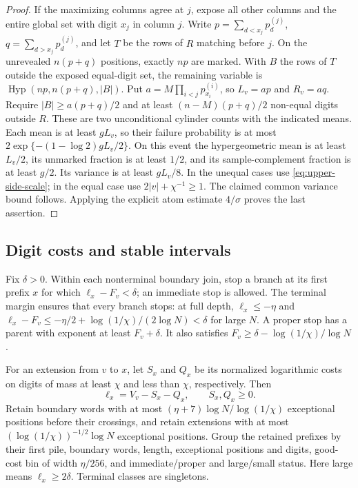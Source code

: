 \begin{proof}
If the maximizing columns agree at $j$, expose all other columns and
the entire global set with digit $x_j$ in column $j$. Write
$p=\sum_{d<x_j}p_d^{(j)}$, $q=\sum_{d>x_j}p_d^{(j)}$, and let
$T$ be the rows of $R$ matching before $j$. On the unrevealed
$n(p+q)$ positions, exactly $np$ are marked. With $B$ the rows of
$T$ outside the exposed equal-digit set, the remaining variable is
$\operatorname{Hyp}(np,n(p+q),|B|)$.
Put $a=M\prod_{i<j}p_{x_i}^{(i)}$, so $L_v=ap$ and $R_v=aq$.
Require $|B|\ge a(p+q)/2$ and at least $(n-M)(p+q)/2$
non-equal digits outside $R$. These are two unconditional cylinder
counts with the indicated means. Each mean is at least $gL_v$,
so their failure probability is at most
$2\exp\{-(1-\log2)gL_v/2\}$. On this event the hypergeometric
mean is at least $L_v/2$, its unmarked fraction is at least $1/2$,
and its sample-complement fraction is at least $g/2$. Its variance
is at least $gL_v/8$.
In the unequal cases use \eqref{eq:upper-side-scale}; in the equal
case use $2|v|+\chi^{-1}\ge1$. The claimed common variance bound
follows. Applying the explicit atom estimate $4/\sigma$ proves the
last assertion.
\end{proof}

\subsection{Digit costs and stable intervals}
Fix $\delta>0$. Within each nonterminal boundary join, stop a branch
at its first prefix $x$ for which $\ell_x-F_v<\delta$; an immediate
stop is allowed. The terminal margin ensures that every branch stops:
at full depth, $\ell_x\le-\eta$ and
$\ell_x-F_v\le-\eta/2+\log(1/\chi)/(2\log N)<\delta$ for large $N$.
A proper stop has a parent with exponent at least $F_v+\delta$.
It also satisfies $F_v\ge\delta-\log(1/\chi)/\log N$.

For an extension from $v$ to $x$, let $S_x$ and $Q_x$ be its
normalized logarithmic costs on digits of mass at least $\chi$ and
less than $\chi$, respectively. Then
\begin{equation}\label{eq:upper-cost-split}
 \ell_x=V_v-S_x-Q_x,\qquad S_x,Q_x\ge0.
\end{equation}
Retain boundary words with at most
$(\eta+7)\log N/\log(1/\chi)$ exceptional positions before their
crossings, and retain extensions with at most
$(\log(1/\chi))^{-1/2}\log N$ exceptional positions.
Group the retained prefixes by their first pile, boundary words,
length, exceptional positions and digits, good-cost bin of width
$\eta/256$, and immediate/proper and large/small status. Here large
means $\ell_x\ge2\delta$. Terminal classes are singletons.

